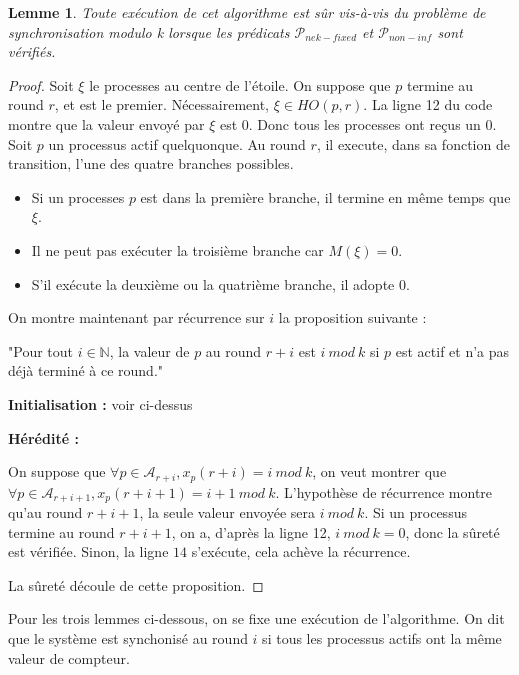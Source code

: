 \documentclass{article}
\newtheorem{lemma}{Lemme}
\begin{document}
\begin{lemma}
	Toute exécution de cet algorithme est sûr vis-à-vis du problème de synchronisation modulo k lorsque les prédicats $\mathcal{P}_{nek-fixed}$ et $\mathcal{P}_{non-inf}$ sont vérifiés.
\end{lemma}
\begin{proof}

	Soit $\xi$ le processes au centre de l'étoile.
	On suppose que $p$ termine au round $r$, et est le premier. Nécessairement, $\xi \in HO(p,r)$.
	La ligne 12 du code montre que la valeur envoyé par $\xi$ est 0.
	Donc tous les processes ont reçus un 0. Soit $p$ un processus actif quelquonque. Au round $r$, il execute, dans sa fonction de transition, l'une des quatre branches possibles.
	\begin{itemize}

		\item Si un processes $p$ est dans la première branche, il termine en même temps que $\xi$.
		\item Il ne peut pas exécuter la troisième branche car $M(\xi) = 0$.
		\item S'il exécute la deuxième ou la quatrième branche, il adopte 0.

	\end{itemize}

	On montre maintenant par récurrence sur $i$ la proposition suivante :

	"Pour tout $i \in \mathds{N}$, la valeur de $p$ au round $r+i$ est $i~mod~k$ si $p$ est actif et n'a pas déjà terminé à ce round."

	\textbf{Initialisation : } voir ci-dessus

	\textbf{Hérédité :}

	On suppose que $\forall p \in \mathcal{A}_{r+i}, x_p(r+i) = i~mod~k$, on veut montrer que $\forall p \in \mathcal{A}_{r+i+1}, x_p(r+i+1) = i+1~mod~k$.
	L'hypothèse de récurrence montre qu'au round $r+i+1$, la seule valeur envoyée sera $i~mod~k$.
	Si un processus termine au round $r+i+1$, on a, d'après la ligne 12, $i~mod~k = 0$, donc la sûreté est vérifiée.
	Sinon, la ligne $14$ s'exécute, cela achève la récurrence.

	La sûreté découle de cette proposition.

\end{proof}

Pour les trois lemmes ci-dessous, on se fixe une exécution de l'algorithme.
On dit que le système est synchonisé au round $i$ si tous les processus actifs ont la même valeur de compteur.
\end{document}
